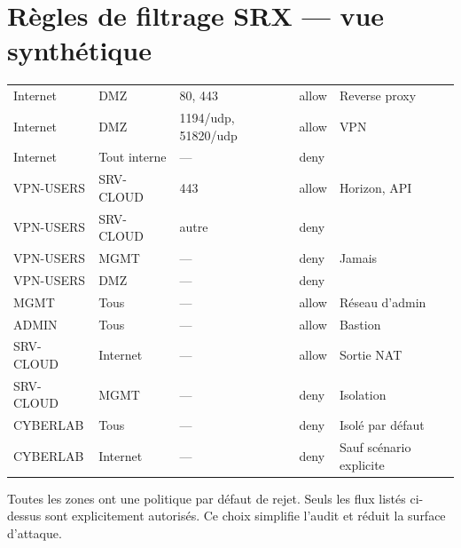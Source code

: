\section{Règles de filtrage SRX — vue synthétique}
\begin{xltabular}{\textwidth}{@{}lXXXX@{}}
\toprule
{} &  &  &  &  \\
\midrule
\endhead
\bottomrule
\endfoot
\bottomrule
\endlastfoot
Internet     & DMZ          & 80, 443           & allow & Reverse proxy \\
Internet     & DMZ          & 1194/udp, 51820/udp & allow & VPN \\
Internet     & Tout interne & —                 & deny  & \\
VPN-USERS    & SRV-CLOUD    & 443               & allow & Horizon, API \\
VPN-USERS    & SRV-CLOUD    & autre             & deny  & \\
VPN-USERS    & MGMT         & —                 & deny  & Jamais \\
VPN-USERS    & DMZ          & —                 & deny  & \\
MGMT         & Tous         & —                 & allow & Réseau d'admin \\
ADMIN        & Tous         & —                 & allow & Bastion \\
SRV-CLOUD    & Internet     & —                 & allow & Sortie NAT \\
SRV-CLOUD    & MGMT         & —                 & deny  & Isolation \\
CYBERLAB     & Tous         & —                 & deny  & Isolé par défaut \\
CYBERLAB     & Internet     & —                 & deny  & Sauf scénario explicite \\

\end{xltabular}

\begin{infobox}
Toutes les zones ont une politique par défaut de rejet. Seuls les flux listés ci-dessus sont explicitement autorisés. Ce choix simplifie l'audit et réduit la surface d'attaque.
\end{infobox}

